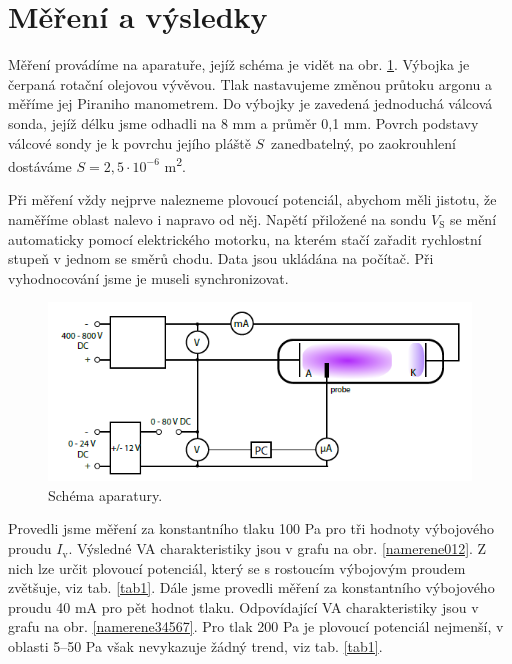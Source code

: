 \documentclass[a4paper,12pt]{article}
\begin{document}
\section{Měření a výsledky}
Měření provádíme na aparatuře, jejíž schéma je vidět na obr. \ref{schema}. Výbojka je čerpaná rotační olejovou vývěvou. Tlak
nastavujeme změnou průtoku argonu a měříme jej Piraniho manometrem. Do výbojky je zavedená jednoduchá válcová sonda, jejíž délku jsme
odhadli na 8 \si{\milli\meter} a průměr 0,1 \si{\milli\meter}. Povrch podstavy válcové sondy je k povrchu jejího pláště $S$~zanedbatelný, po zaokrouhlení dostáváme $S = 2,5\cdot10^{-6}$ \si{\meter\squared}. 

Při měření vždy nejprve nalezneme plovoucí potenciál, abychom měli jistotu, že naměříme oblast nalevo i napravo od něj. Napětí přiložené na sondu $V_\text{S}$ se mění automaticky pomocí elektrického motorku, na kterém stačí zařadit rychlostní stupeň v jednom
se směrů chodu. Data jsou ukládána na počítač. Při vyhodnocování jsme je museli synchronizovat.   

\begin{figure}[h]
	\centering
	\includegraphics[width=120mm]{schema.png}
	\caption{Schéma aparatury.}
	\label{schema}
\end{figure}

Provedli jsme měření za konstantního tlaku 100 \si{\pascal} pro tři hodnoty výbojového proudu $I_\text{v}$. Výsledné VA charakteristiky
jsou v grafu na obr. \ref{namerene012}. Z nich lze určit plovoucí potenciál, který se s rostoucím výbojovým proudem zvětšuje, viz tab.
\ref{tab1}. Dále jsme provedli měření za konstantního výbojového proudu 40 \si{\milli\ampere} pro pět hodnot tlaku. Odpovídající VA
charakteristiky jsou v grafu na obr. \ref{namerene34567}. Pro tlak 200 \si{\pascal} je plovoucí potenciál nejmenší, v oblasti 5--50
\si{\pascal} však nevykazuje žádný trend, viz tab. \ref{tab1}.
\end{document}
